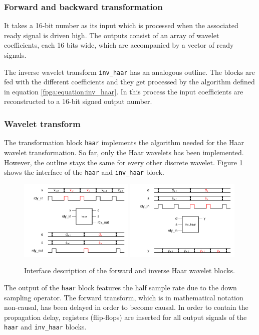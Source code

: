 \begin{refsection}
\subsubsection{Forward and backward transformation}

It takes a 16-bit number as its input which is processed when the associated ready signal is driven high.
The outputs consist of an array of wavelet coefficients, each 16 bits wide, which are accompanied by a vector of ready signals. 

The inverse wavelet transform \texttt{inv\_haar} has an analogous outline.
The blocks are fed with the different coefficients and they get processed by the algorithm defined in equation \ref{fpga:equation:inv_haar}.
In this process the input coefficients are reconstructed to a 16-bit signed output number.


\subsubsection{Wavelet transform}

The transformation block \texttt{haar} implements the algorithm needed for the Haar wavelet transformation.
So far, only the Haar wavelets has been implemented.
However, the outline stays the same for every other discrete wavelet.
Figure \ref{fpga:fig:haar} shows the interface of the \texttt{haar} and \texttt{inv\_haar} block.
\begin{figure}
	\centering
	\includegraphics[width=0.49\textwidth]{papers/fpga/images/haar.pdf} %
	\includegraphics[width=0.49\textwidth]{papers/fpga/images/inv_haar.pdf}
	\caption{Interface description of the forward and inverse Haar wavelet blocks. \label{fpga:fig:haar}}
\end{figure}
The output of the \texttt{haar} block features the half sample rate due to the down sampling operator.
The forward transform, which is in mathematical notation non-causal, has been delayed in order to become causal.
In order to contain the propagation delay, registers (flip-flops) are inserted for all output signals of the \texttt{haar} and \texttt{inv\_haar} blocks.


\end{refsection}

